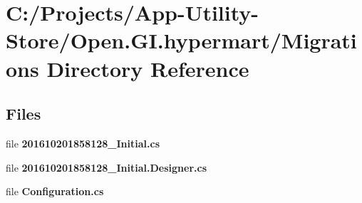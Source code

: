\section{C\+:/\+Projects/\+App-\/\+Utility-\/\+Store/\+Open.G\+I.\+hypermart/\+Migrations Directory Reference}
\label{dir_ce83933c9e82398669a6e1b6e44585c2}
\subsection*{Files}
\begin{DoxyCompactItemize}
\item 
file \textbf{ 201610201858128\+\_\+\+Initial.\+cs}
\item 
file \textbf{ 201610201858128\+\_\+\+Initial.\+Designer.\+cs}
\item 
file \textbf{ Configuration.\+cs}
\end{DoxyCompactItemize}
